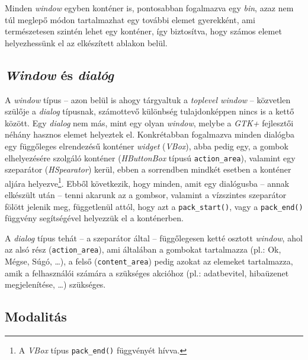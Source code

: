 Minden \textit{window} egyben konténer is, pontosabban fogalmazva egy \textit{bin}, azaz nem túl meglepő módon tartalmazhat egy további elemet gyerekként, ami természetesen szintén lehet egy konténer, így biztosítva, hogy számos elemet helyezhessünk el az elkészített ablakon belül.

\subsection{\textit{Window} és \textit{dialóg}}

\label{par:dialogbox}
A \textit{window} típus -- azon belül is ahogy tárgyaltuk a \textit{toplevel window} -- közvetlen szülője a \textit{dialog} típusnak, számottevő különbség tulajdonképpen nincs is a kettő között. Egy \textit{dialog} nem más, mint egy olyan \textit{window}, melybe a \textit{GTK+} fejlesztői néhány hasznos elemet helyeztek el. Konkrétabban fogalmazva minden dialógba egy függőleges elrendezésű konténer \textit{widget} (\textit{VBox}), abba pedig egy, a gombok elhelyezésére szolgáló konténer (\textit{HButtonBox} típusú \texttt{action\_area}), valamint egy szeparátor (\textit{HSpearator}) kerül, ebben a sorrendben mindkét esetben a konténer aljára helyezve\footnote{A \textit{VBox} típus \texttt{pack\_end()} függvényét hívva.}. Ebből következik, hogy minden, amit egy dialógusba -- annak elkészült után -- tenni akarunk az a gombsor, valamint a vízszintes szeparátor fölött jelenik meg, függetlenül attól, hogy azt a \texttt{pack\_start()}, vagy a \texttt{pack\_end()} függvény segítségével helyezzük el a konténerben.

A \textit{dialog} típus tehát -- a szeparátor által -- függőlegesen ketté osztott \textit{window}, ahol az alsó rész (\texttt{action\_area}), ami általában a gombokat tartalmazza (pl.: Ok, Mégse, Súgó, \dots), a felső (\texttt{content\_area}) pedig azokat az elemeket tartalmazza, amik a felhasználói számára a szükséges akcióhoz (pl.: adatbevitel, hibaüzenet megjelenítése, \dots) szükséges.

\subsection{Modalitás}
\label{sec:windowmodal}


